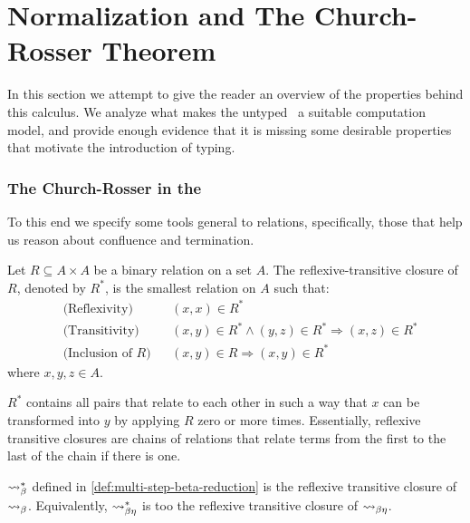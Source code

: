 \section{\centering Normalization and The Church-Rosser Theorem}
\label{sec:normalization-and-cr}
In this section we attempt to give the reader an overview of the properties behind this calculus. We analyze what makes the untyped \lcalc \ a suitable computation model, and provide enough evidence that it is missing some desirable properties that motivate the introduction of typing.
\subsubsection{\centering  The Church-Rosser in the \lCalc}
To this end we specify some tools general to relations, specifically, those that help us reason about confluence and termination.
\begin{definition}
  Let $R \subseteq A \times A$ be a binary relation on a set $A$. The reflexive-transitive closure of $R$, denoted by $R^{*}$, is the smallest relation on $A$ such that:
  \[
  \begin{aligned}
    &\text{(Reflexivity)} && (x, x) \in R^{*} \\
    &\text{(Transitivity)} && (x, y) \in R^{*} \wedge (y, z) \in R^{*} \Rightarrow (x, z) \in R^{*} \\
    &\text{(Inclusion of $R$)} && (x, y) \in R \Rightarrow (x, y) \in R^{*}
  \end{aligned}
\]
where $x, y, z \in A$.
\end{definition}
\begin{remark}
  $R^*$ contains all pairs that relate to each other in such a way that $x$ can be transformed into $y$ by applying $R$ zero or more times. Essentially, reflexive transitive closures are chains of relations that relate terms from the first to the last of the chain if there is one.
\end{remark}
\begin{example}
  $\mathrel{\leadsto}_\beta^*$ defined in \ref{def:multi-step-beta-reduction} is the reflexive transitive closure of $\mathrel{\leadsto}_\beta$. Equivalently, $\mathrel{\leadsto}^*_{\beta\eta}$ is too the reflexive transitive closure of $\mathrel{\leadsto}_{\beta\eta}$.
\end{example}
